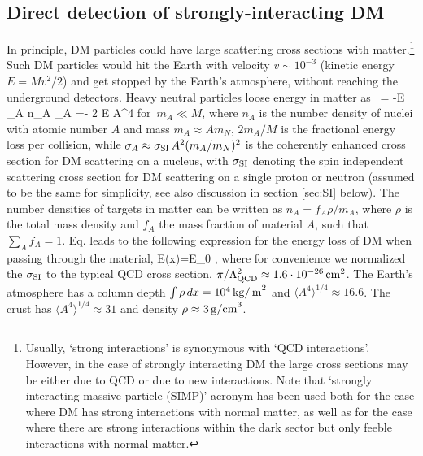 \subsection{Direct detection of strongly-interacting DM}\label{sec:SIMP}
In principle, DM particles could have large scattering cross sections with matter.\footnote{Usually, `strong interactions' is synonymous with `QCD interactions'. However, in the case of strongly interacting DM the large cross sections may be either due to QCD or due to new interactions. Note that `strongly interacting massive particle (SIMP)' acronym has been used both for the case where DM has strong interactions with normal matter, as well as for the case where there are strong interactions within the dark sector but only feeble interactions with normal matter.}
Such DM particles would hit the Earth with velocity $v \sim 10^{-3}$  (kinetic energy $E = M v^2 /2$)
and get stopped by the Earth's atmosphere, without reaching the underground detectors.
Heavy neutral particles loose energy in matter as~\cite{SIMP}
\beq\label{eq:dEdx}
 = -E \sum_A  n_A \sigma_A      
=- 2 E \rho \langle A^4 \rangle {}
\qquad \hbox{for $m_A\ll M$},
\eeq
where $n_A$ is the number density of nuclei with atomic number $A$ and mass $m_A \approx A m_N$, 
$2m_A/M$ is the fractional energy loss per collision, 
while $\sigma_A\approx \sigma_{\rm SI} \, A^2 (m_A/m_N)^2$ is the coherently enhanced
cross section for DM scattering on a nucleus, with $\sigma_{\rm SI}$ denoting the spin independent scattering cross section for DM scattering on a single proton or neutron (assumed to be the same for simplicity, see also discussion in section \ref{sec:SI} below).
The number densities of targets in matter can be written as $n_A = f_A \rho/m_A$,  where
$\rho$ is the total mass density and $f_A$ the mass fraction of material $A$, such that $\sum_A f_A =1$.
Eq. leads to the following expression for the energy loss of DM when passing through the material,
\beq
\label{eq:flightpathdEdx} E(x)=E_0  \exp{},
\eeq
where for convenience we normalized the $\sigma_{\rm SI}$ to the typical QCD cross section, $\pi/{\Lambda_{\rm QCD}^2}\approx 1.6 \cdot 10^{-26}\,{\rm cm}^2$.
The Earth's atmosphere has a column depth $\int \rho\, dx =10^4 \, {\rm kg/\,{\rm m}}^2$ and $\langle A^4 \rangle^{1/4} \approx 16.6$.
The crust  has $\langle A^4 \rangle^{1/4}\approx 31$ and density $\rho\approx 3\,{\rm g/cm}^3$.
